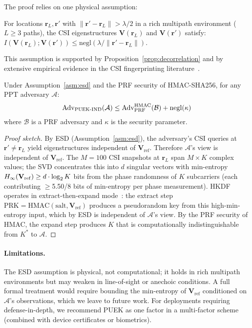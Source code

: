 The proof relies on one physical assumption:

\begin{assumption}
\label{asm:esd}
For locations $\mathbf{r}_L, \mathbf{r}'$ with $\|\mathbf{r}' - \mathbf{r}_L\| > \lambda/2$ in a rich multipath environment ($L \geq 3$ paths), the CSI eigenstructures $\mathbf{V}(\mathbf{r}_L)$ and $\mathbf{V}(\mathbf{r}')$ satisfy:
$I(\mathbf{V}(\mathbf{r}_L); \mathbf{V}(\mathbf{r}')) \leq \mathrm{negl}(\lambda / \|\mathbf{r}' - \mathbf{r}_L\|)$.
\end{assumption}

This assumption is supported by Proposition~\ref{prop:decorrelation} and by extensive empirical evidence in the CSI fingerprinting literature~\cite{wang2020csibehavior}.

\begin{proposition}
\label{prop:puek-security}
Under Assumption~\ref{asm:esd} and the PRF security of HMAC-SHA256, for any PPT adversary $\mathcal{A}$:
\[
\mathrm{Adv}_{\textsc{PUEK}\text{-IND}}(\mathcal{A}) \leq \mathrm{Adv}_{\mathrm{PRF}}^{\mathrm{HMAC}}(\mathcal{B}) + \mathrm{negl}(\kappa)
\]
where $\mathcal{B}$ is a PRF adversary and $\kappa$ is the security parameter.
\end{proposition}

\begin{proof}[Proof sketch]
By ESD (Assumption~\ref{asm:esd}), the adversary's CSI queries at $\mathbf{r}' \neq \mathbf{r}_L$ yield eigenstructures independent of $\mathbf{V}_{\mathrm{ref}}$.
Therefore $\mathcal{A}$'s view is independent of $\mathbf{V}_{\mathrm{ref}}$.
The $M = 100$ CSI snapshots at $\mathbf{r}_L$ span $M \times K$ complex values; the SVD concentrates this into $d$ singular vectors with min-entropy $H_{\infty}(\mathbf{V}_{\mathrm{ref}}) \geq d \cdot \log_2 K$ bits from the phase randomness of $K$ subcarriers (each contributing $\geq$5.50/8 bits of min-entropy per phase measurement).
HKDF operates in extract-then-expand mode~\cite{rfc5869}: the extract step $\mathrm{PRK} = \mathrm{HMAC}(\mathrm{salt}, \mathbf{V}_{\mathrm{ref}})$ produces a pseudorandom key from this high-min-entropy input, which by ESD is independent of $\mathcal{A}$'s view.
By the PRF security of HMAC, the expand step produces $K$ that is computationally indistinguishable from $K^*$ to $\mathcal{A}$.
\end{proof}

\paragraph{Limitations.}
The ESD assumption is physical, not computational; it holds in rich multipath environments but may weaken in line-of-sight or anechoic conditions.
A full formal treatment would require bounding the min-entropy of $\mathbf{V}_{\mathrm{ref}}$ conditioned on $\mathcal{A}$'s observations, which we leave to future work.
For deployments requiring defense-in-depth, we recommend PUEK as one factor in a multi-factor scheme (combined with device certificates or biometrics).

